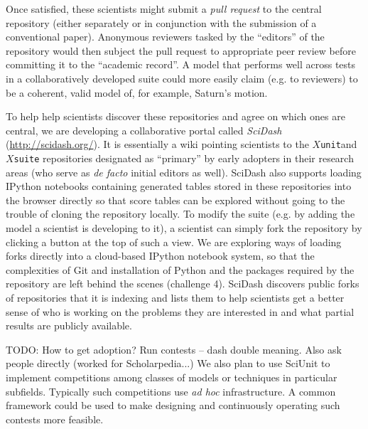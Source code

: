 \documentclass[9pt]{sig-alternate}
\newcommand{\verbx}[1]{\lstinline{#1}}
\begin{document}
Once satisfied, these scientists might submit a \emph{pull request} to the central repository (either separately or in conjunction with the submission of a conventional paper). Anonymous reviewers tasked by the ``editors'' of the repository would then subject the pull request to appropriate peer review before committing it to the ``academic record''. A model that performs well across tests in a collaboratively developed suite could more easily claim (e.g. to reviewers) to be a coherent, valid model of, for example, Saturn's motion. 



To help help scientists discover these repositories and agree on which ones are central, we are developing a collaborative portal called \textit{SciDash} (\url{http://scidash.org/}). It is essentially a wiki pointing scientists to the $X$\verbx{unit}and $X$\verbx{suite} repositories designated as ``primary'' by early adopters in their research areas (who serve as \emph{de facto} initial editors as well). SciDash also supports loading IPython notebooks containing generated tables stored in these repositories into the browser directly so that score tables can be explored without going to the trouble of cloning the repository locally. To modify the suite (e.g. by adding the model a scientist is developing to it), a scientist can simply fork the repository by clicking a button at the top of such a view. We are exploring ways of loading forks directly into a cloud-based IPython notebook system, so that the complexities of Git and installation of Python and the packages required by the repository are left behind the scenes (challenge 4). SciDash discovers public forks of repositories that it is indexing and lists them to help scientists get a better sense of who is working on the problems they are interested in and what partial results are publicly available.

TODO: How to get adoption? Run contests -- dash double meaning. Also ask people directly (worked for Scholarpedia...) We also plan to use SciUnit to implement competitions among classes of models or techniques in particular subfields. Typically such competitions use \emph{ad hoc} infrastructure. A common framework could be used to make designing and continuously operating such contests more feasible. 
\end{document}
